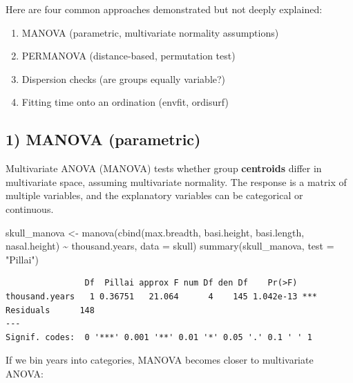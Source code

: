 \documentclass[
  letterpaper,
  8pt,
  a4paper]{book}
\newenvironment{Shaded}{\begin{snugshade}}{\end{snugshade}}
\newcommand{\AttributeTok}[1]{\textcolor[rgb]{0.40,0.45,0.13}{#1}}
\newcommand{\FunctionTok}[1]{\textcolor[rgb]{0.28,0.35,0.67}{#1}}
\newcommand{\NormalTok}[1]{\textcolor[rgb]{0.00,0.23,0.31}{#1}}
\newcommand{\OtherTok}[1]{\textcolor[rgb]{0.00,0.23,0.31}{#1}}
\newcommand{\SpecialCharTok}[1]{\textcolor[rgb]{0.37,0.37,0.37}{#1}}
\newcommand{\StringTok}[1]{\textcolor[rgb]{0.13,0.47,0.30}{#1}}
\providecommand{\tightlist}{%
  \setlength{\itemsep}{0pt}\setlength{\parskip}{0pt}}
\begin{document}
Here are four common approaches demonstrated but not deeply explained:

\begin{enumerate}
\def\labelenumi{\arabic{enumi}.}
\tightlist
\item
  MANOVA (parametric, multivariate normality assumptions)\\
\item
  PERMANOVA (distance-based, permutation test)\\
\item
  Dispersion checks (are groups equally variable?)
\item
  Fitting time onto an ordination (envfit, ordisurf)
\end{enumerate}

\subsection*{1) MANOVA (parametric)}\label{manova-parametric}

Multivariate ANOVA (MANOVA) tests whether group \textbf{centroids}
differ in multivariate space, assuming multivariate normality. The
response is a matrix of multiple variables, and the explanatory
variables can be categorical or continuous.

\begin{Shaded}
\begin{Highlighting}[]
\NormalTok{skull\_manova }\OtherTok{\textless{}{-}} \FunctionTok{manova}\NormalTok{(}\FunctionTok{cbind}\NormalTok{(max.breadth, basi.height, basi.length, nasal.height) }\SpecialCharTok{\textasciitilde{}}\NormalTok{ thousand.years,}
                  \AttributeTok{data =}\NormalTok{ skull)}
\FunctionTok{summary}\NormalTok{(skull\_manova, }\AttributeTok{test =} \StringTok{"Pillai"}\NormalTok{)}
\end{Highlighting}
\end{Shaded}

\begin{verbatim}
                Df  Pillai approx F num Df den Df    Pr(>F)    
thousand.years   1 0.36751   21.064      4    145 1.042e-13 ***
Residuals      148                                             
---
Signif. codes:  0 '***' 0.001 '**' 0.01 '*' 0.05 '.' 0.1 ' ' 1
\end{verbatim}

If we bin years into categories, MANOVA becomes closer to multivariate
ANOVA:
\end{document}
